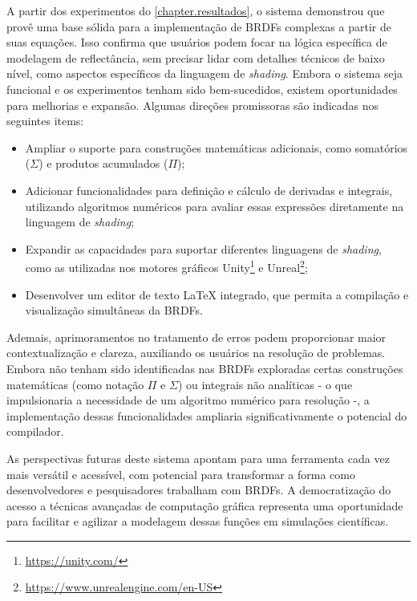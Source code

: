 
A partir dos experimentos do \autoref{chapter.resultados}, o sistema demonstrou que provê uma base sólida para a implementação de BRDFs complexas a partir de suas equações. Isso confirma que usuários podem focar na lógica específica de modelagem de reflectância, sem precisar lidar com detalhes técnicos de baixo nível, como aspectos específicos da linguagem de \textit{shading}. Embora o sistema seja funcional e os experimentos tenham sido bem-sucedidos, existem oportunidades para melhorias e expansão. Algumas direções promissoras são indicadas nos seguintes items:

\begin{itemize}
    \item Ampliar o suporte para construções matemáticas adicionais, como somatórios ($\Sigma$) e produtos acumulados ($\Pi$);
    \label{items-melhorias}
    \item Adicionar funcionalidades para definição e cálculo de derivadas e integrais, utilizando algoritmos numéricos para avaliar essas expressões diretamente na linguagem de \textit{shading};
    \item Expandir as capacidades para suportar diferentes linguagens de \textit{shading}, como as utilizadas nos motores gráficos Unity\footnote{\url{https://unity.com/}} e Unreal\footnote{\url{https://www.unrealengine.com/en-US}};
    \item Desenvolver um editor de texto \LaTeX{} integrado, que permita a compilação e visualização simultâneas da BRDFs.
\end{itemize}

Ademais, aprimoramentos no tratamento de erros podem proporcionar maior contextualização e clareza, auxiliando os usuários na resolução de problemas. Embora não tenham sido identificadas nas BRDFs exploradas certas construções matemáticas (como notação $\Pi$ e $\Sigma$) ou integrais não analíticas - o que impulsionaria a necessidade de um algoritmo numérico para resolução -, a implementação dessas funcionalidades ampliaria significativamente o potencial do compilador.

As perspectivas futuras deste sistema apontam para uma ferramenta cada vez mais versátil e acessível, com potencial para transformar a forma como desenvolvedores e pesquisadores trabalham com BRDFs. A democratização do acesso a técnicas avançadas de computação gráfica representa uma oportunidade para facilitar e agilizar a modelagem dessas funções em simulações científicas.
